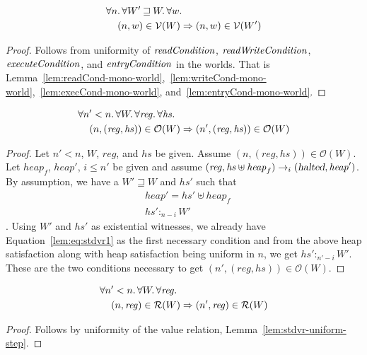 \documentclass{article}
\newcommand{\var}[1]{\mathit{#1}}
\newcommand{\hs}{\var{hs}}
\newcommand{\reg}{\var{reg}}
\newcommand{\heap}{\var{heap}}
\newcommand{\halted}{\textsl{halted}}
\newcommand{\plainfun}[2]{
  \ifthenelse{\equal{#2}{}}
             {\mathit{#1}}
             {\mathit{#1}(#2)}
}
\newcommand{\readCond}[1]{\plainfun{readCondition}{#1}}
\newcommand{\writeCond}[1]{\plainfun{readWriteCondition}{#1}}
\newcommand{\execCond}[1]{\plainfun{executeCondition}{#1}}
\newcommand{\entryCond}[1]{\plainfun{entryCondition}{#1}}
\newcommand{\future}{\mathbin{\sqsupseteq}}
\newcommand{\heapSat}[3][\heap]{#1 :_{#2} #3}
\newcommand{\asmType}{\plaindom{AsmType}}
\newcommand{\plaindom}[1]{\mathrm{#1}}
\newcommand{\intr}[2]{\mathcal{#1}}
\newcommand{\valueintr}[1]{\intr{V}{#1}}
\newcommand{\regintr}[1]{\intr{R}{#1}}
\newcommand{\stdvr}{\valueintr{\asmType}}
\newcommand{\stdrr}{\regintr{\asmType}}
\newcommand{\observations}{\mathcal{O}}
\newcommand{\npair}[2][n]{\left(#1,#2 \right)}
\newcommand{\step}[1][]{\rightarrow_{#1}}
\begin{document}
\begin{lemma}
  \begin{align*}
    &\forall n \ldotp \forall W' \future W \ldotp \forall w \ldotp\\ 
    &\quad \npair{w} \in \stdvr(W) \Rightarrow \npair{w} \in \stdvr(W')
  \end{align*}
\end{lemma}
\begin{proof}
  Follows from uniformity of $\readCond{}$, $\writeCond{}$, $\execCond{}$, and $\entryCond{}$ in the worlds. That is Lemma~\ref{lem:readCond-mono-world},~\ref{lem:writeCond-mono-world},~\ref{lem:execCond-mono-world}, and~\ref{lem:entryCond-mono-world}.
\end{proof}

\begin{lemma}
  \begin{align*}
    &\forall n' < n \ldotp \forall W \ldotp \forall \reg \ldotp \forall \hs \ldotp\\
    &\quad \npair{(\reg,\hs)} \in \observations(W) \Rightarrow \npair[n']{(\reg,\hs)} \in \observations(W)
  \end{align*}
\end{lemma}
\begin{proof}
  Let $n' < n$, $W$, $\reg$, and $\hs$ be given. Assume $\npair{(\reg,\hs)} \in \observations(W)$. Let $\heap_f$, $heap'$, $i \leq n'$ be given and assume $(\reg, \hs \uplus \heap_f) \step[i] (\halted, \heap')$. By assumption, we have a $W' \future W$ and $\hs'$ such that
  \begin{align}
&\heap' = \hs' \uplus \heap_f \label{lem:eq:stdvr1}\\
&\heapSat[\hs']{n-i}{W'}\label{lem:eq:stdvr2}
  \end{align}. 
Using $W'$ and $\hs'$ as existential witnesses, we already have Equation~\ref{lem:eq:stdvr1} as the first necessary condition and from the above heap satisfaction along with heap satisfaction being uniform in $n$, we get $\heapSat[\hs']{n'-i}{W'}$. These are the two conditions necessary to get $\npair[n']{(\reg,\hs)} \in \observations(W)$.
\end{proof}

\begin{lemma}
  \begin{align*}
    &\forall n' < n \ldotp \forall W \ldotp \forall \reg \ldotp\\
    &\quad \npair{\reg} \in \stdrr(W) \Rightarrow \npair[n']{\reg} \in \stdrr(W)
  \end{align*}
\end{lemma}
\begin{proof}
  Follows by uniformity of the value relation, Lemma~\ref{lem:stdvr-uniform-step}.
\end{proof}
\end{document}
